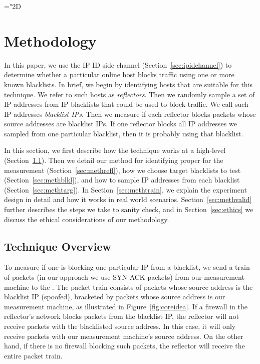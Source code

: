 \mathchardef\mhyphen="2D %

\section{Methodology}
\label{sec:methodology}

In this paper, we use the IP ID side channel (Section~\ref{sec:ipidchannel})
to determine whether a particular online host blocks traffic using one
or more known blacklists. In brief, we begin by identifying hosts that are
suitable for this technique. We refer to such hosts as
\emph{reflectors}. Then we randomly sample a set of IP addresses
from IP blacklists that could be used to block traffic. We call
such IP addresses \emph{blacklist IPs}. Then we measure if
each reflector blocks packets whose source addresses are blacklist
IPs. If one reflector blocks all IP addresses we sampled
from one particular blacklist, then it is probably using that blacklist.

In this section, we first describe how the technique works at a
high-level (Section~\ref{sec:meththeory}). Then we detail
our method for identifying proper {} for the
measurement (Section~\ref{sec:methrefl}), how we choose target blacklists to test (Section~\ref{sec:methblkl}), and how to sample IP addresses from each
blacklist (Section~\ref{sec:methtarg}). In Section~\ref{sec:methtrain}, we
explain the experiment design in detail and how it works in
real world scenarios. Section~\ref{sec:methvalid} further describes the steps
we take to sanity check, and in Section~\ref{sec:ethics} we discuss the
ethical considerations of our methodology.

\subsection{Technique Overview}
\label{sec:meththeory}

To measure if one {} is blocking one particular IP from a blacklist,
we send a train of packets (in our approach we use SYN-ACK packets)
from our measurement machine to the {}. The packet train consists
of packets whose source address is the blacklist IP (spoofed),
bracketed by packets whose source address is our measurement machine,
as illustrated in Figure~\ref{fig:coreidea}. If a firewall in the
reflector's network blocks packets from the blacklist IP, the
reflector will not receive packets with the blacklisted source address. In
this case, it will only receive packets with our measurement machine's source
address. On the other hand, if there is no firewall blocking such packets, the
reflector will receive the entire packet train.

